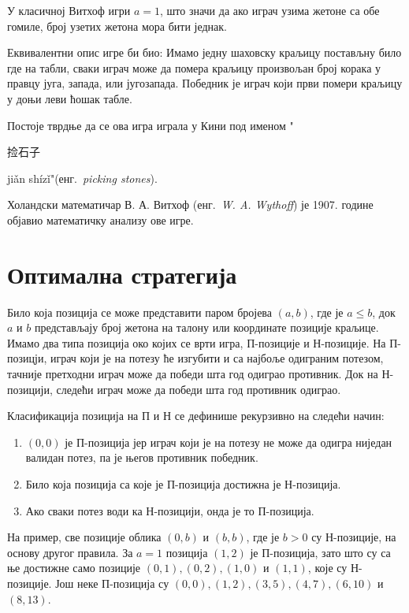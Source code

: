 \documentclass[a4paper]{article}
\begin{document}
У класичној Витхоф игри $ a = 1 $, што значи да ако играч узима жетоне са обе гомиле, број узетих жетона мора бити једнак.

Еквивалентни опис игре би био: Имамо једну шаховску краљицу постављну било где на табли, сваки играч може да помера краљицу произвољан број корака у правцу југа, запада, или југозапада. Победник је играч који први помери краљицу у доњи леви ћошак табле.\cite{cut-the-knot} \cite{singingbanana-youtube}

Постоје тврдње да се ова игра играла у Кини  под именом "\begin{CJK}{UTF8}{gbsn}捡石子\end{CJK} jiǎn shízǐ"(енг.{~\em picking stones}). \cite{Yaglom}

Холандски математичар В. А. Витхоф (енг.{~\em W. A. Wythoff}) је 1907. године објавио математичку анализу ове игре. \cite{wythoff1907modification}

\section{Оптимална стратегија}
\label{sec:optimalna_strategija}

Било која позиција се може представити паром бројева $ (a, b) $, где је $ a \le  b $, док  $ a $ и $ b $ представљају број жетона на талону или координате позиције краљице. Имамо два типа позиција око којих се врти игра, П-позиције и Н-позиције. На П-позицји, играч који је на потезу ће изгубити и са најбоље одиграним потезом, тачније претходни играч може да победи шта год одиграо противник. Док на Н-позицији, следећи играч може да победи шта год противник одиграо. %

Класификација позиција на П и Н се дефинише рекурзивно на следећи начин:
\begin{enumerate}
	\item $ (0, 0) $ је П-позиција јер играч који је на потезу не може да одигра ниједан валидан потез, па је његов противник победник.
	\item Било која позиција са које је П-позиција достижна је Н-позиција. 
	\item Ако сваки потез води ка Н-позицији, онда је то П-позиција.
\end{enumerate}

На пример, све позиције облика $ (0, b) $ и $ (b, b) $, где је $ b > 0 $ су Н-позиције, на основу другог правила. За $ a = 1 $ позиција  $ (1, 2) $  је П-позиција, зато што су са ње достижне само позиције $ (0, 1), (0, 2), (1, 0) $ и $ (1, 1) $, које су Н-позиције. Још неке П-позиција су $ (0, 0), (1, 2), (3, 5), (4, 7), (6, 10) $ и $ (8, 13) $. 
\end{document}
